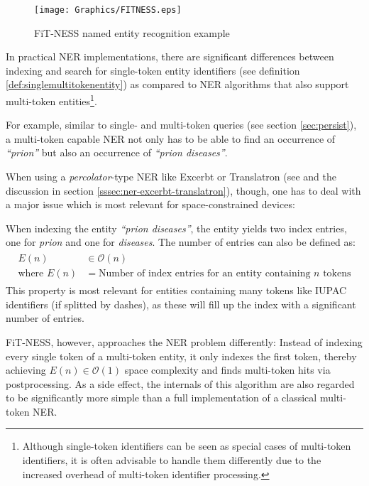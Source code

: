 \documentclass[a4paper, 12pt, twoside, reqn]{report}
\numberwithin{figure}{chapter}
\newtheorem[L]{boxedDefinition}{Definition}
\newtheorem[L]{boxedExample}{Example}
\newcommand{\itquote}[1]{\textit{{``}#1{''}}}
\begin{document}
\begin{figure}[!htb]
  \centering
  \texttt{[image: Graphics/FITNESS.eps]}
  \caption[FiT-NESS NER example]{FiT-NESS named entity recognition example}
  \label{fig:fit-ness}
\end{figure}

In practical NER implementations, there are significant differences between indexing and search for single-token entity identifiers (see definition \ref{def:singlemultitokenentity}) as compared to NER algorithms that also support multi-token entities\footnote{Although single-token identifiers can be seen as special cases of multi-token identifiers, it is often advisable to handle them differently due to the increased overhead of multi-token identifier processing.}.

For example, similar to single- and multi-token queries (see section \ref{sec:persist}), a multi-token capable NER not only has to be able to find an occurrence of \itquote{prion} but also an occurrence of \itquote{prion diseases}.

When using a \textit{percolator}-type NER like Excerbt or Translatron (see \cite[section 4.3.1]{wachinger2013next} and the discussion in section \ref{sssec:ner-excerbt-translatron}), though, one has to deal with a major issue which is most relevant for space-constrained devices:

When indexing the entity \itquote{prion diseases}, the entity yields two index entries, one for \textit{prion} and one for \textit{diseases}. The number of entries can also be defined as:
\begin{align}\label{eq:index-num-tokens}
\begin{split}
E(n) &\in \mathcal{O}(n)\\
\text{where~} E(n) &= \text{Number of index entries for an entity containing $n$ tokens}
\end{split}
\end{align}
This property is most relevant for entities containing many tokens like IUPAC identifiers (if splitted by dashes), as these will fill up the index with a significant number of entries.

FiT-NESS, however, approaches the NER problem differently: Instead of indexing every single token of a multi-token entity, it only indexes the first token, thereby achieving $E(n) \in \mathcal{O}(1)$ space complexity and finds multi-token hits via postprocessing. As a side effect, the internals of this algorithm are also regarded to be significantly more simple than a full implementation of a classical multi-token NER.
\end{document}
